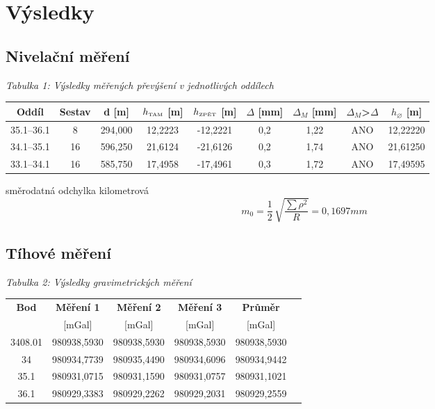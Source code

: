 \section{Výsledky}

\subsection{Nivelační měření}

\begin{table}[H]
    \centering
    \textit{Tabulka 1: Výsledky měřených převýšení v jednotlivých oddílech}
    
    \begin{tabular}{|c|c|c|c|c|c|c|c|c|}
        \hline
        \textbf{Oddíl} & \textbf{Sestav} & d [m] & $h_{\text{\tiny{TAM}}}$ [m] & $h_{\text{\tiny{ZPĚT}}}$ [m] & $\Delta$ [mm] & $\Delta_M$ [mm] & $\Delta_M$>$\Delta$ & $h_{\diameter}$ [m] \\
        \hline \hline
        35.1–36.1 & 8  & 294,000 & 12,2223 & -12,2221 & 0,2 & 1,22 & ANO & 12,22220\\ \hline
        34.1–35.1 & 16 & 596,250 & 21,6124 & -21,6126 & 0,2 & 1,74 & ANO & 21,61250\\ \hline 
        33.1–34.1 & 16 & 585,750 & 17,4958 & -17,4961 & 0,3 & 1,72 & ANO & 17,49595\\ \hline
    \end{tabular}
\end{table}

směrodatná odchylka kilometrová
\[
  m_0 = \frac{1}{2}\,\sqrt{\frac{\sum\rho^2}{R}}= 0,1697 mm
\]

\subsection{Tíhové měření}

\begin{table}[H]
  \centering
  \textit{Tabulka 2: Výsledky gravimetrických měření}
  \begin{tabular}{|c|c|c|c|c|c|}
    \hline
    \textbf{Bod} & \textbf{Měření 1} & \textbf{Měření 2} & \textbf{Měření 3} & \textbf{Průměr} \\
    & {[mGal]} & {[mGal]} & {[mGal]} & {[mGal]} \\ 
    \hline\hline
    3408.01 & 980938,5930 & 980938,5930 & 980938,5930 & 980938,5930 \\ \hline
    34   & 980934,7739 & 980935,4490 & 980934,6096 & 980934,9442 \\ \hline
    35.1 & 980931,0715 & 980931,1590 & 980931,0757 & 980931,1021\\ \hline
    36.1 & 980929,3383 & 980929,2262 & 980929,2031 & 980929,2559\\ \hline
  \end{tabular}
\end{table}

